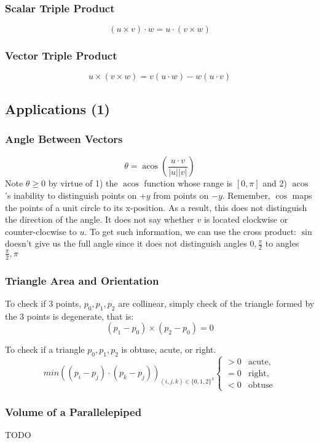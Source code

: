 \documentclass[12pt]{report}
\DeclareMathOperator{\acos}{acos}
\begin{document}
\subsubsection{Scalar Triple Product}
$$(u \times v) \cdot w = u \cdot (v \times w)$$
\subsubsection{Vector Triple Product}
$$u \times (v \times w) = v(u \cdot w) - w(u \cdot v)$$
\subsection{Applications (1)}
	\subsubsection{Angle Between Vectors}
	$$
	\theta = \acos\left(\frac{u \cdot v}{|u||v|}\right)
	$$
	Note $\theta \geq 0$ by virtue of 1) the $\acos$ function whose range is $[0, \pi]$ and 2) $\acos$'s inability to distinguish points on $+y$ from points on $-y$. Remember, $\cos$ maps the points of a unit circle to its x-position. As a result, this does not distinguish the direction of the angle. It does not say whether $v$ is located clockwise or counter-clocwise to $u$. To get such information, we can use the cross product:
	$\sin$ doesn't give us the full angle since it does not distinguish angles $0, \frac{\pi}{2}$ to angles $\frac{\pi}{2}, \pi$
	
	\subsubsection{Triangle Area and Orientation}
	
	To check if 3 points, ${p_0, p_1, p_2}$ are collinear, simply check of the triangle formed by the 3 points is degenerate, that is:
	$$
	(p_1-p_0)\times (p_2-p_0) = 0
	$$
	
	To check if a triangle ${p_0, p_1, p_2}$ is obtuse, acute, or right.
	$$
	min((p_i - p_j) \cdot (p_k - p_j))_{ (i,j,k) \in \{0,1,2\}^3}
	\begin{cases}
            > 0 &\text{acute},\\
            = 0 & \text{right}, \\
            < 0 & \text{obtuse}
        \end{cases}
	$$
	
	\subsubsection{Volume of a Parallelepiped}
	TODO
\end{document}
